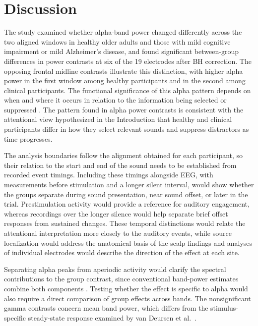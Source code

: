 \documentclass[11pt,letterpaper]{article}
\begin{document}
\section{Discussion}
The study examined whether alpha-band power changed differently across the two aligned windows in healthy older adults and those with mild cognitive impairment or mild Alzheimer's disease, and found significant between-group differences in power contrasts at six of the 19 electrodes after BH correction. The opposing frontal midline contrasts illustrate this distinction, with higher alpha power in the first window among healthy participants and in the second among clinical participants. The functional significance of this alpha pattern depends on when and where it occurs in relation to the information being selected or suppressed \cite{ronconi,wostmann}. The pattern found in alpha power contrasts is consistent with the attentional view hypothesized in the Introduction that healthy and clinical participants differ in how they select relevant sounds and suppress distractors as time progresses.

The analysis boundaries follow the alignment obtained for each participant, so their relation to the start and end of the sound needs to be established from recorded event timings. Including these timings alongside EEG, with measurements before stimulation and a longer silent interval, would show whether the groups separate during sound presentation, near sound offset, or later in the trial. Prestimulation activity would provide a reference for auditory engagement, whereas recordings over the longer silence would help separate brief offset responses from sustained changes. These temporal distinctions would relate the attentional interpretation more closely to the auditory events, while source localization would address the anatomical basis of the scalp findings and analyses of individual electrodes would describe the direction of the effect at each site.

Separating alpha peaks from aperiodic activity would clarify the spectral contributions to the group contrast, since conventional band-power estimates combine both components \cite{donoghue}. Testing whether the effect is specific to alpha would also require a direct comparison of group effects across bands. The nonsignificant gamma contrasts concern mean band power, which differs from the stimulus-specific steady-state response examined by van Deursen et al.\ \cite{vandeursen}.
\end{document}
